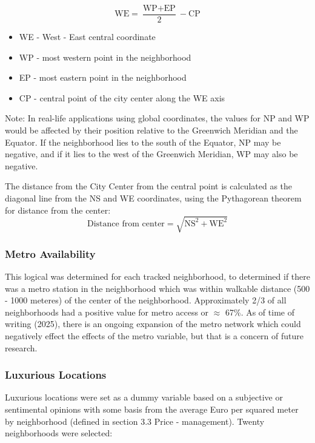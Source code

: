 \documentclass[]{article}
\begin{document}
\begin{equation*}
	\text{WE} = \frac{\text{WP}+\text{EP}}{2} - \text{CP}
\end{equation*}
\begin{itemize}
	\scriptsize
	\item[] WE - West - East central coordinate
	\item[] WP - most western point in the neighborhood
	\item[] EP - most eastern point in the neighborhood
	\item[] CP - central point of the city center along the WE axis
\end{itemize}
\begin{center}
	\scriptsize
	Note: In real-life applications using global coordinates, the values for NP and WP would be affected by their position relative to the Greenwich Meridian and the Equator. If the neighborhood lies to the south of the Equator, NP may be negative, and if it lies to the west of the Greenwich Meridian, WP may also be negative.
\end{center}

The distance from the City Center from the central point is calculated as the diagonal line from the NS and WE coordinates, using the Pythagorean theorem for distance from the center: \\

\begin{equation*}
	\text{Distance from center} = \sqrt{\text{NS}^2+\text{WE}^2}
\end{equation*}

\subsubsection{Metro Availability}
This logical was determined for each tracked neighborhood, to determined if there was a metro station in the neighborhood which was within walkable distance (500 - 1000 meteres) of the center of the neighborhood. Approximately 2/3 of all neighborhoods had a positive value for metro access or $\approx$ 67\%. As of time of writing (2025), there is an ongoing expansion of the metro network which could negatively effect the effects of the metro variable, but that is a concern of future research.  


\subsubsection{Luxurious Locations}
Luxurious locations were set as a dummy variable based on a subjective or sentimental opinions with some basis from the average Euro per squared meter by neighborhood (defined in section 3.3 Price - management). Twenty neighborhoods were selected:
\end{document}
